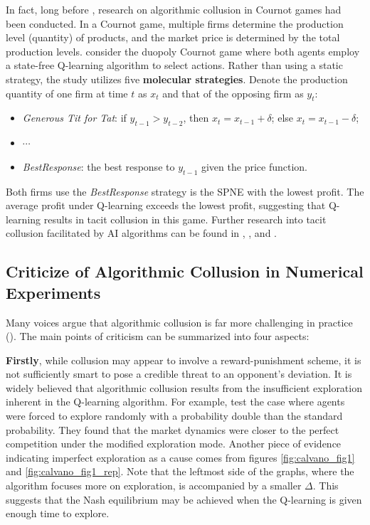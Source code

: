 \documentclass[mnsc,nonblindrev]{workingpaper}
\begin{document}
In fact, long before \cite{calvano2019algorithmic}, research on algorithmic collusion in Cournot games had been conducted. In a Cournot game, multiple firms determine the production level (quantity) of products, and the market price is determined by the total production levels. \cite{kimbrough2005learning} consider the duopoly Cournot game where both agents employ a state-free Q-learning algorithm to select actions. Rather than using a static strategy, the study utilizes five \textbf{molecular strategies}. Denote the production quantity of one firm at time $t$ as $x_t$ and that of the opposing firm as $y_t$:
\begin{itemize}
    \item \textit{Generous Tit for Tat}: if $y_{t-1}>y_{t-2}$, then $x_t=x_{t-1}+\delta$; else $x_t=x_{t-1}-\delta$;
    \item $\cdots$
    \item \textit{BestResponse}: the best response to $y_{t-1}$ given the price function.
\end{itemize}
Both firms use the \textit{BestResponse} strategy is the SPNE with the lowest profit. The average profit under Q-learning exceeds the lowest profit, suggesting that Q-learning results in tacit collusion in this game. Further research into tacit collusion facilitated by AI algorithms can be found in \cite{waltman2008q}, \cite{kimbrough2009learning}, and \cite{siallagan2013aspiration}.

\subsection{Criticize of Algorithmic Collusion in Numerical Experiments}
\label{subsec:criticize}

Many voices argue that algorithmic collusion is far more challenging in practice (\cite{schwalbe2018algorithms}). The main points of criticism can be summarized into four aspects:

\textbf{Firstly}, while collusion may appear to involve a reward-punishment scheme, it is not sufficiently smart to pose a credible threat to an opponent's deviation. It is widely believed that algorithmic collusion results from the insufficient exploration inherent in the Q-learning algorithm. For example, \cite{abada2023artificial} test the case where agents were forced to explore randomly with a probability double than the standard probability. They found that the market dynamics were closer to the perfect competition under the modified exploration mode. Another piece of evidence indicating imperfect exploration as a cause comes from figures \ref{fig:calvano_fig1} and \ref{fig:calvano_fig1_rep}. Note that the leftmost side of the graphs, where the algorithm focuses more on exploration, is accompanied by a smaller $\Delta$. This suggests that the Nash equilibrium may be achieved when the Q-learning is given enough time to explore.
\end{document}

